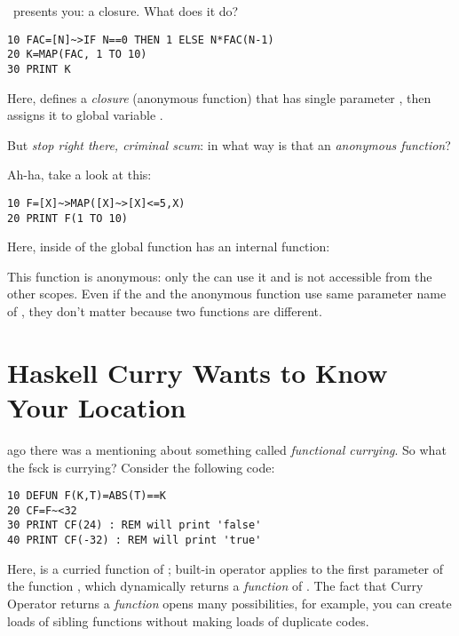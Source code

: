 \tbas\ presents you: a closure. What does it do?

\begin{lstlisting}
10 FAC=[N]~>IF N==0 THEN 1 ELSE N*FAC(N-1)
20 K=MAP(FAC, 1 TO 10)
30 PRINT K
\end{lstlisting}

Here, \code{[N]$\sim\!>$\,\ldots} defines a \emph{closure} (anonymous function) that has single parameter , then assigns it to global variable .

But \emph{stop right there, criminal scum}: in what way is that an \emph{anonymous function}?

Ah-ha, take a look at this:

\begin{lstlisting}
10 F=[X]~>MAP([X]~>[X]<=5,X)
20 PRINT F(1 TO 10)
\end{lstlisting}

Here,  inside of the global function  has an internal function: 

This function is anonymous: only the  can use it and is not accessible from the other scopes. Even if the  and the anonymous function use same parameter name of , they don't matter because two functions are different.


\section[Currying]{Haskell Curry Wants to Know Your Location}
\label{currying101}

\setcounter{curryingselfref}{\value{page} - \value{curryingappearance}}

 ago there was a mentioning about something called \emph{functional currying}. So what the fsck is currying? Consider the following code:

\begin{lstlisting}
10 DEFUN F(K,T)=ABS(T)==K
20 CF=F~<32
30 PRINT CF(24) : REM will print 'false'
40 PRINT CF(-32) : REM will print 'true'
\end{lstlisting}

Here,  is a curried function of ; built-in operator \code{$\sim\!<$} applies  to the first parameter of the function , which dynamically returns a \emph{function} of . The fact that Curry Operator returns a \emph{function} opens many possibilities, for example, you can create loads of sibling functions without making loads of duplicate codes.

